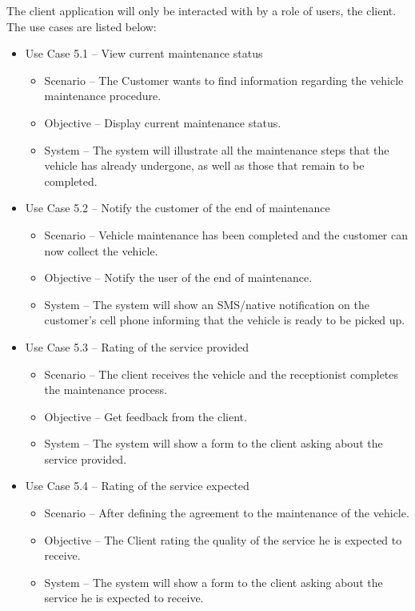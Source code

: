 The client application will only be interacted with by a role of users, the client.
The use cases are listed below:

\begin{itemize}
  \item Use Case 5.1 – View current maintenance status
  \begin{itemize}
    \item Scenario – The Customer wants to find information regarding the vehicle maintenance procedure.
    \item Objective – Display current maintenance status.
    \item System – The system will illustrate all the maintenance steps that the vehicle has already undergone, as well as those that remain to be completed. 
  \end{itemize}
  \item Use Case 5.2 – Notify the customer of the end of maintenance 
  \begin{itemize}
    \item Scenario – Vehicle maintenance has been completed and the customer can now collect the vehicle.
    \item Objective – Notify the user of the end of maintenance.
    \item System – The system will show an SMS/native notification on the customer's cell phone informing that the vehicle is ready to be picked up. 
  \end{itemize}
  \item Use Case 5.3 – Rating of the service provided
  \begin{itemize}
    \item Scenario – The client receives the vehicle and the receptionist completes the maintenance process.
    \item Objective – Get feedback from the client.
    \item System – The system will show a form to the client asking about the service provided. 
  \end{itemize}
    \item Use Case 5.4 – Rating of the service expected
  \begin{itemize}
    \item Scenario – After defining the agreement to the maintenance of the vehicle.
    \item Objective – The Client rating the quality of the service he is expected to receive.
    \item System – The system will show a form to the client asking about the service he is expected to receive. 

\end{itemize}
\end{itemize}
